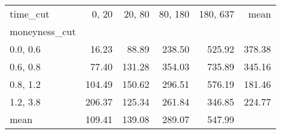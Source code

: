 \begin{tabular}{lrrrrr}
\toprule
time\_cut &  0, 20 &  20, 80 &  80, 180 &  180, 637 &   mean \\
moneyness\_cut &          &           &            &             &        \\
\midrule
0.0, 0.6    &    16.23 &     88.89 &     238.50 &      525.92 & 378.38 \\
0.6, 0.8    &    77.40 &    131.28 &     354.03 &      735.89 & 345.16 \\
0.8, 1.2    &   104.49 &    150.62 &     296.51 &      576.19 & 181.46 \\
1.2, 3.8    &   206.37 &    125.34 &     261.84 &      346.85 & 224.77 \\
mean          &   109.41 &    139.08 &     289.07 &      547.99 &        \\
\bottomrule
\end{tabular}
